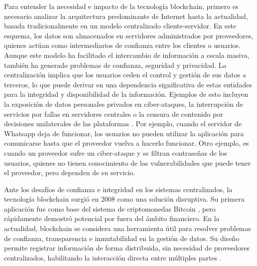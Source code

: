 Para entender la necesidad e impacto de la tecnología blockchain, primero es necesario analizar la arquitectura predominante de Internet hasta la actualidad, basada tradicionalmente en un modelo centralizado cliente-servidor. En este esquema, los datos son almacenados en servidores administrados por proveedores, quienes actúan como intermediarios de confianza entre los clientes o usuarios. Aunque este modelo ha facilitado el intercambio de información a escala masiva, también ha generado problemas de confianza, seguridad y privacidad. La centralización implica que los usuarios ceden el control y gestión de sus datos a terceros, lo que puede derivar en una dependencia significativa de estas entidades para la integridad y disponibilidad de la información. Ejemplos de esto incluyen la exposición de datos personales privados en ciber-ataques, la interrupción de servicios por fallas en servidores centrales o la censura de contenido por decisiones unilaterales de las plataformas \cite{pending}. Por ejemplo, cuando el servidor de Whatsapp deja de funcionar, los usuarios no pueden utilizar la aplicación para comunicarse hasta que el proveedor vuelva a hacerlo funcionar. Otro ejemplo, es cuando un proveedor sufre un ciber-ataque y se filtran contraseñas de los usuarios, quienes no tienen conocimiento de las vulnerabilidades que puede tener el proveedor, pero dependen de su servicio.

Ante los desafíos de confianza e integridad en los sistemas centralizados, la tecnología blockchain surgió en 2008 como una solución disruptiva. Su primera aplicación fue como base del sistema de criptomonedas Bitcoin \cite{satoshi2008bitcoin}, pero rápidamente demostró potencial por fuera del ámbito financiero. En la actualidad, blockchain se considera una herramienta útil para resolver problemas de confianza, transparencia e inmutabilidad en la gestión de datos. Su diseño permite registrar información de forma distribuida, sin necesidad de proveedores centralizados, habilitando la interacción directa entre múltiples partes \cite{bulkowska2023implementation}.

